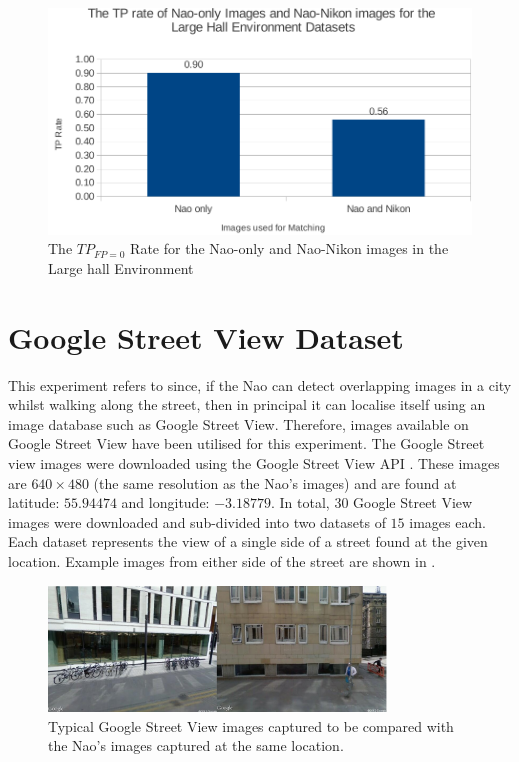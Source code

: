 \begin{figure}[h!] 
  \centering
    \includegraphics[width=1.0\textwidth]{../Drawings/Graphs/tp_rate_nikon_lh.pdf}
    \caption{The $TP_{FP=0}$ Rate for the Nao-only and Nao-Nikon images in the Large hall Environment}
    \label{fig:tp_rate_nikon_lh}
\end{figure}
\section{Google Street View Dataset}
\label{sec:streetView}
This experiment refers to  since, if the Nao can detect overlapping images in a city whilst walking along the street, then in principal it can localise itself using an image database such as Google Street View. Therefore, images available on Google Street View have been utilised for this experiment. The Google Street view images were downloaded using the Google Street View API \citep{StreetView}. These images are $640 \times 480$ (the same resolution as the Nao's images) and are found at latitude: $55.94474$ and longitude: $-3.18779$. In total, $30$ Google Street View images were downloaded and sub-divided into two datasets of $15$ images each. Each dataset represents the view of a single side of a street found at the given location. Example images from either side of the street are shown in .\\

 \begin{figure}[h!] 
  \centering
    \includegraphics[width=0.8\textwidth]{../Drawings/streetView/googleStreetView.jpg}
    \caption{Typical Google Street View images captured to be compared with the Nao's images captured at the same location.}
    \label{fig:googleStreetImages}
\end{figure}

